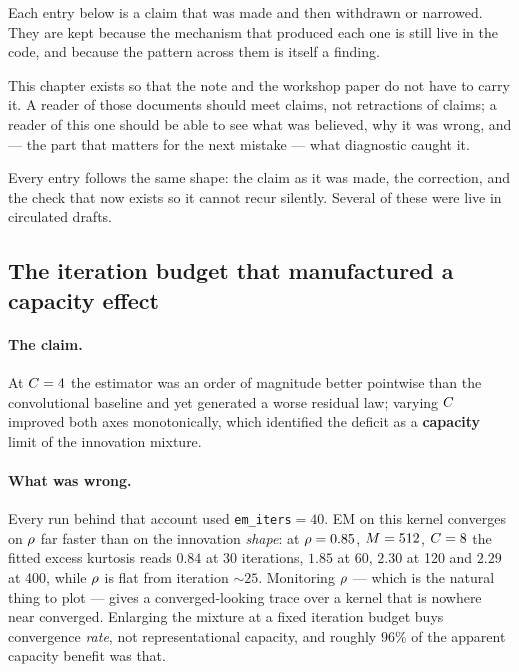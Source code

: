 Each entry below is a claim that was made and then withdrawn or narrowed. They
are kept because the mechanism that produced each one is still live in the
code, and because the pattern across them is itself a finding.

This chapter exists so that the note and the workshop paper do not have to carry it. A reader of
those documents should meet claims, not retractions of claims; a reader of this one should be
able to see what was believed, why it was wrong, and --- the part that matters for the next
mistake --- what diagnostic caught it.

Every entry follows the same shape: the claim as it was made, the correction, and the check that
now exists so it cannot recur silently. Several of these were live in circulated drafts.

\subsection{The iteration budget that manufactured a capacity effect}
\label{sec:corr-capacity}

\paragraph{The claim.} At $C=4$ the estimator was an order of magnitude better pointwise
than the convolutional baseline and yet generated a worse residual law; varying $C$ improved
both axes monotonically, which identified the deficit as a \textbf{capacity} limit of the
innovation mixture.

\paragraph{What was wrong.} Every run behind that account used \texttt{em\_iters}${}=40$. EM on
this kernel converges on $\rho$ far faster than on the innovation \emph{shape}: at $\rho=0.85$,
$M=512$, $C=8$ the fitted excess kurtosis reads $0.84$ at 30 iterations, $1.85$ at 60,
$2.30$ at 120 and $2.29$ at 400, while $\rho$ is flat from iteration ${\sim}25$. Monitoring
$\rho$ --- which is the natural thing to plot --- gives a converged-looking trace over a kernel
that is nowhere near converged. Enlarging the mixture at a fixed iteration budget buys
convergence \emph{rate}, not representational capacity, and roughly $96\%$ of the apparent
capacity benefit was that.

